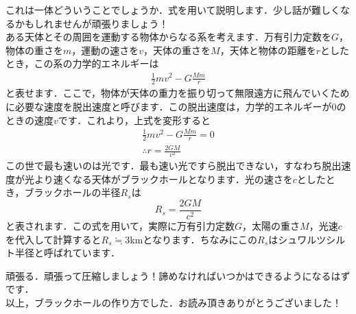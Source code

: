 \documentclass[dvipdfmx,a4paper,10pt]{jarticle}
\def\rm#1{\mathrm{#1}}
\begin{document}
\begin{tcolorbox}[enhanced,empty,left skip=0pt,left=5pt,
		coltitle=white,title={\bf どういうこと？},sharp corners,
		overlay={
				\begin{tcbclipframe}
					\fill[black] (title.south west)--++(3,0)--++(0,1)--++(-3,0)--cycle;
				\end{tcbclipframe}}]
	これは一体どういうことでしょうか．式を用いて説明します．少し話が難しくなるかもしれませんが頑張りましょう！\\
	ある天体とその周囲を運動する物体からなる系を考えます．万有引力定数を$G$，物体の重さを$m$，運動の速さを$v$，天体の重さを$M$，天体と物体の距離を$r$としたとき，この系の力学的エネルギーは
	\begin{gather*}
		\frac{1}{2}mv^2 - G\frac{Mm}{r}
	\end{gather*}
	と表せます．ここで，物体が天体の重力を振り切って無限遠方に飛んでいくために必要な速度を脱出速度と呼びます．この脱出速度は，力学的エネルギーが0のときの速度$v$です．これより，上式を変形すると
	\begin{gather*}
		\frac{1}{2}mv^2 - G\frac{Mm}{r} = 0\\
		\therefore r = \frac{2GM}{v^2}
	\end{gather*}
	この世で最も速いのは光です．最も速い光ですら脱出できない，すなわち脱出速度が光より速くなる天体がブラックホールとなります．光の速さを$c$としたとき，ブラックホールの半径$R_s$は
	\begin{equation}
		R_s = \frac{2GM}{c^2}
		\nonumber
	\end{equation}
	と表されます．この式を用いて，実際に万有引力定数$G$，太陽の重さ$M$，光速$c$を代入して計算すると$R_s \fallingdotseq 3\rm{km}$となります．ちなみにこの$R_s$はシュワルツシルト半径と呼ばれています．
	
	\begin{tcolorbox}[enhanced,empty,left skip=0pt,left=5pt,
			coltitle=white,title={\bf どうやって圧縮するの？},sharp corners,
			overlay={
					\begin{tcbclipframe}
						\fill[black] (title.south west)--++(4.3,0)--++(0,1)--++(-4.3,0)--cycle;
					\end{tcbclipframe}}]
		頑張る．頑張って圧縮しましょう！諦めなければいつかはできるようになるはずです．\\
		以上，ブラックホールの作り方でした．お読み頂きありがとうございました！
	\end{tcolorbox}
	
\end{tcolorbox}
\end{document}

